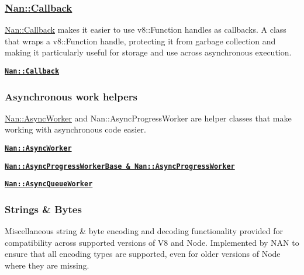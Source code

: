 \subsubsection*{\hyperlink{class_nan_1_1_callback}{Nan\+::\+Callback}}

{\ttfamily \hyperlink{class_nan_1_1_callback}{Nan\+::\+Callback}} makes it easier to use {\ttfamily v8\+::\+Function} handles as callbacks. A class that wraps a {\ttfamily v8\+::\+Function} handle, protecting it from garbage collection and making it particularly useful for storage and use across asynchronous execution.


\begin{DoxyItemize}
\item \href{doc/callback.md#api_nan_callback}{\tt {\bfseries {\ttfamily Nan\+::\+Callback}}}
\end{DoxyItemize}

\subsubsection*{Asynchronous work helpers}

{\ttfamily \hyperlink{class_nan_1_1_async_worker}{Nan\+::\+Async\+Worker}} and {\ttfamily Nan\+::\+Async\+Progress\+Worker} are helper classes that make working with asynchronous code easier.


\begin{DoxyItemize}
\item \href{doc/asyncworker.md#api_nan_async_worker}{\tt {\bfseries {\ttfamily Nan\+::\+Async\+Worker}}}
\item \href{doc/asyncworker.md#api_nan_async_progress_worker}{\tt {\bfseries {\ttfamily Nan\+::\+Async\+Progress\+Worker\+Base \& Nan\+::\+Async\+Progress\+Worker}}}
\item \href{doc/asyncworker.md#api_nan_async_queue_worker}{\tt {\bfseries {\ttfamily Nan\+::\+Async\+Queue\+Worker}}}
\end{DoxyItemize}

\subsubsection*{Strings \& Bytes}

Miscellaneous string \& byte encoding and decoding functionality provided for compatibility across supported versions of V8 and Node. Implemented by N\+AN to ensure that all encoding types are supported, even for older versions of Node where they are missing.


